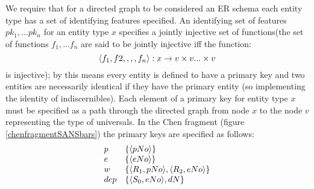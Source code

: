 \documentclass[10pt,a4paper]{article}
\newcommand{\set}[1]{\left\{#1\right\}}
\newcommand{\veee}{v}
\begin{document}
We require that 
for a directed graph to be considered an ER schema each entity type has a set of identifying features
 specified. 
An identifying set of features  $pk_1,...pk_n$ for an entity type $x$ specifies a jointly injective set of functions(the set of functions $f_1,...f_n$ are said to be jointly injective iff the function:
$$
\tuple{f_1,f2,,,,f_n}: x \morph \veee \times \veee ... \times \veee
$$
is injective); by this means every entity is defined to have a primary key and two entities are necessarily identical if they have the primary entity (so implementing the identity of indiscernibles). Each element of a primary key for entity type $x$ must be specified as a path through the directed graph from node $x$ to the node $\veee$ representing the type of universals.  In the Chen fragment (figure \ref{chenfragmentSANSbars}) the primary keys are specified as follows:
$$
\begin{array}{l l}
p & \set{\tuple{pNo}} \\
e & \set{\tuple{eNo}} \\
w & \set{\tuple{R_1,pNo},\tuple{R_2,eNo}} \\
dep & \set{\tuple{S_0,eNo},dN}
\end{array}
$$
\end{document}
